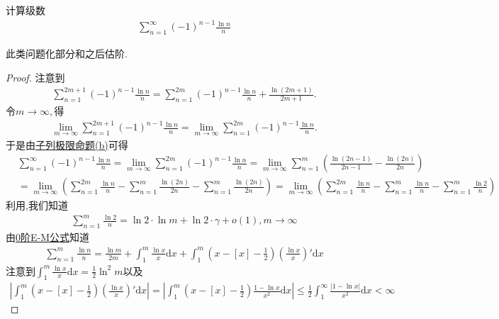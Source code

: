 \documentclass[../../main.tex]{subfiles}%
\begin{document}
\begin{example}
计算级数
\begin{align*}
\sum_{n=1}^{\infty} (-1)^{n - 1} \frac{\ln n}{n}
\end{align*}
\end{example}
\begin{note}
此类问题化部分和之后估阶.
\end{note}
\begin{proof}
注意到
\begin{align*}
\sum_{n=1}^{2m+1}{\left( -1 \right) ^{n-1}\frac{\ln n}{n}}=\sum_{n=1}^{2m}{\left( -1 \right) ^{n-1}\frac{\ln n}{n}}+\frac{\ln \left( 2m+1 \right)}{2m+1}.
\end{align*}
令$m\rightarrow \infty ,$得
\begin{align*}
\underset{m\rightarrow \infty}{\lim}\sum_{n=1}^{2m+1}{\left( -1 \right) ^{n-1}\frac{\ln n}{n}}=\underset{m\rightarrow \infty}{\lim}\sum_{n=1}^{2m}{\left( -1 \right) ^{n-1}\frac{\ln n}{n}}.
\end{align*}
于是由\hyperref[proposition:子列极限命题]{子列极限命题(b)}可得
\begin{align*}
&\sum_{n=1}^{\infty} (-1)^{n - 1} \frac{\ln n}{n} = \lim_{m \to \infty} \sum_{n=1}^{2m} (-1)^{n - 1} \frac{\ln n}{n} = \lim_{m \to \infty} \sum_{n=1}^{m} \left( \frac{\ln(2n - 1)}{2n - 1} - \frac{\ln(2n)}{2n} \right) \\
&= \lim_{m \to \infty} \left( \sum_{n=1}^{2m} \frac{\ln n}{n} - \sum_{n=1}^{m} \frac{\ln(2n)}{2n} - \sum_{n=1}^{m} \frac{\ln(2n)}{2n} \right) = \lim_{m \to \infty} \left( \sum_{n=1}^{2m} \frac{\ln n}{n} - \sum_{n=1}^{m} \frac{\ln n}{n} - \sum_{n=1}^{m} \frac{\ln 2}{n} \right)
\end{align*}
利用,我们知道
\begin{align*}
\sum_{n=1}^{m} \frac{\ln 2}{n} = \ln 2 \cdot \ln m + \ln 2 \cdot \gamma + o(1), m \to \infty
\end{align*}
由\hyperref[theorem:0阶Euler-Maclaurin公式(0阶E-M公式)]{0阶E-M公式}知道
\begin{align*}
\sum_{n=1}^{m} \frac{\ln n}{n} = \frac{\ln m}{2m} + \int_{1}^{m} \frac{\ln x}{x} \mathrm{d}x + \int_{1}^{m} \left( x - [x] - \frac{1}{2} \right) \left( \frac{\ln x}{x} \right)' \mathrm{d}x
\end{align*}
注意到$\int_{1}^{m} \frac{\ln x}{x} \mathrm{d}x = \frac{1}{2} \ln^2 m$以及
\begin{align*}
\left| \int_{1}^{m} \left( x - [x] - \frac{1}{2} \right) \left( \frac{\ln x}{x} \right)' \mathrm{d}x \right| = \left| \int_{1}^{m} \left( x - [x] - \frac{1}{2} \right) \frac{1 - \ln x}{x^2} \mathrm{d}x \right| \leqslant \frac{1}{2} \int_{1}^{\infty} \frac{|1 - \ln x|}{x^2} \mathrm{d}x < \infty

\end{align*}
\end{proof}
\end{document}
